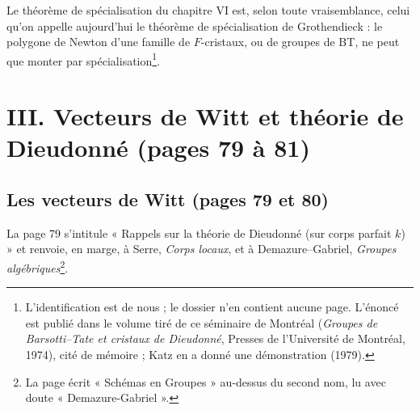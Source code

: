 \documentclass[11pt,a4paper]{article}
\begin{document}
Le théorème de spécialisation du chapitre VI est, selon toute
vraisemblance, celui qu'on appelle aujourd'hui le théorème de
spécialisation de Grothendieck : le polygone de Newton d'une famille de
$F$-cristaux, ou de groupes de BT, ne peut que monter par
spécialisation\footnote{L'identification est de nous ; le dossier n'en
contient aucune page. L'énoncé est publié dans le volume tiré de ce
séminaire de Montréal (\emph{Groupes de Barsotti–Tate et cristaux de
Dieudonné}, Presses de l'Université de Montréal, 1974), cité de mémoire ;
Katz en a donné une démonstration (1979).}.

\section*{III. Vecteurs de Witt et théorie de Dieudonné (pages 79 à 81)}

\subsection*{Les vecteurs de Witt (pages 79 et 80)}

La page 79 s'intitule « Rappels sur la théorie de Dieudonné (sur corps
parfait $k$) » et renvoie, en marge, à Serre, \emph{Corps locaux}, et à
Demazure–Gabriel, \emph{Groupes algébriques}\footnote{La page écrit
« Schémas en Groupes » au-dessus du second nom, lu avec doute
« Demazure-Gabriel ».}.
\end{document}
